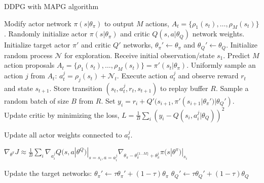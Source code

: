 \begin{algorithm}[h]
  \caption{DDPG with MAPG algorithm}
  \label{alg:ddpgmap}
\begin{algorithmic}
  \STATE Modify actor network $\pi(s|\theta_\pi)$ to output $M$ actions,  $A_t = \{\rho_1(s_t), \ldots, \rho_M(s_t) \} $.
  \STATE Randomly initialize actor $\pi(s|\theta_\pi)$ and critic $Q(s, a|\theta_Q)$ network weights.
  \STATE Initialize target actor $\pi'$ and critic $Q'$ networks, $\theta_\pi' \gets \theta_\pi$ and $\theta_Q' \gets \theta_Q$.  
  \STATE Initialize random process $\mathcal{N}$ for exploration.
  \STATE Receive initial observation/state $s_1$.
  \STATE Predict $M$ action proposals $A_t = \{\rho_1(s_t), \ldots, \rho_M(s_t) \} = \pi'(s_t|\theta_\pi)$.
  \STATE Uniformly sample an action $j$ from $A_t$: $a^j_t = \rho_j(s_t) + \mathcal{N}_t$.
  \STATE Execute action $a^j_t$ and observe reward $r_t$ and state $s_{t+1}$.
  \STATE Store transition $(s_t, a^j_t, r_t, s_{t+1})$ to replay buffer $R$.
  \STATE Sample a random batch of size $B$ from $R$.
  \STATE Set $y_i = r_i + Q'(s_{i+1}, \pi'(s_{i+1}|\theta_\pi')|\theta_Q')$.
  \STATE Update critic by minimizing the loss, 
  \STATE \hspace{2em} $L = \frac{1}{B} \sum_{i} (y_i - Q(s_i, a^j_i|\theta_Q))^2$    

  \STATE Update all actor weights connected to $a^j_t$. %

   \STATE \hspace{2em} $\nabla_{\theta^\pi} J \approx \frac{1}{B} \sum_{i} \nabla_{a^j_i}Q(s, a| \theta^Q)|_{s=s_i, a=a^j_i} \nabla_{\theta_\pi - \theta_\pi^{\{1 \dots M\}}+ \theta_\pi^j} \pi(s|\theta^\pi)|_{s_i}$
   
  \STATE Update the target networks: 
  \STATE \hspace{2em} $\theta_\pi' \gets \tau\theta_\pi' + (1-\tau)\theta_\pi$
  \STATE \hspace{2em} $\theta_Q' \gets \tau\theta_Q' + (1-\tau)\theta_Q$
  \ENDFOR
  \ENDFOR
\end{algorithmic}
\end{algorithm}
